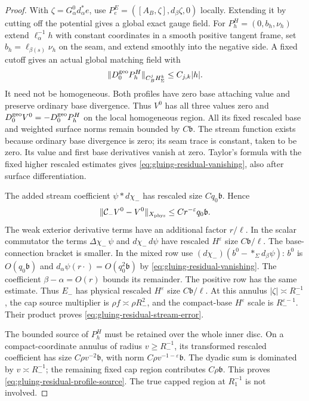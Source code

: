\documentclass[11pt]{amsart}
\theoremstyle{definition}
\theoremstyle{remark}
\theoremstyle{plain}
\begin{document}
\begin{proof}
With $\zeta=G^0_\alpha d_\alpha^*e$, use
$P^E_e=([A_B,\zeta],d_\beta\zeta,0)$ locally. Extending it
by cutting off the potential gives a global exact gauge field.
For $P^H_h=(0,b_h,\nu_h)$ extend $\ell_\alpha^{-1}h$ with
constant coordinates in a smooth positive tangent frame, set
$b_h=\ell_{\beta(s)}\nu_h$ on the seam, and extend smoothly
into the negative side. A fixed cutoff gives an actual global
matching field with
\[
                  \|D_0^{\rm geo}P^H_h\|_{C_B^jH^k_\Sigma}
                                                    \leq C_{j,k}|h|.
\]
It need not be homogeneous. Both profiles have zero base attaching
value and preserve ordinary base divergence. Thus $V^0$ has all
three values zero and $D_0^{\rm geo}V^0=-D_0^{\rm geo}P^H_h$
on the local homogeneous region. All its fixed rescaled base and
weighted surface norms remain bounded by $C\mathfrak b$.
The stream function exists because ordinary base divergence is zero;
its seam trace is constant, taken to be zero. Its value and first
base derivatives vanish at zero. Taylor's formula with the fixed
higher rescaled estimates gives \eqref{eq:gluing-residual-vanishing},
also after surface differentiation.

The added stream coefficient $\psi*d\chi_-$ has rescaled size
$Cq_0\mathfrak b$. Hence
\[
 \|\mathcal C_-V^0-V^0\|_{X_{\rm phys}}
                                      \leq Cr^{-\varepsilon}q_0\mathfrak b.
\]
The weak exterior derivative terms have an additional factor
$r/\ell$. In the scalar commutator the terms
$\Delta\chi_-\,\psi$ and $d\chi_-\,d\psi$ have rescaled
$H^\varepsilon$ size $C\mathfrak b/\ell$.
The base-connection bracket is smaller. In the mixed row use
$(d\chi_-)(b^0-*_\Sigma d_\beta\psi)$:
$b^0$ is $O(q_0\mathfrak b)$ and
$d_\alpha\psi(r\cdot)=O(q_0^2\mathfrak b)$ by
\eqref{eq:gluing-residual-vanishing}. The coefficient
$\beta-\alpha=O(r)$ bounds its remainder. The positive row
has the same estimate. Thus $E_-$ has physical rescaled
$H^\varepsilon$ size $C\mathfrak b/\ell$.
At this annulus $|\zeta|\asymp R_-^{-1}$, the cap source
multiplier is $\rho f\asymp\rho R_-^2$, and the compact-base
$H^\varepsilon$ scale is $R_-^{\varepsilon-1}$. Their product
proves \eqref{eq:gluing-residual-stream-error}.

The bounded source of $P^H_h$ must be retained over the whole
inner disc. On a compact-coordinate annulus of radius $v\geq R_-^{-1}$,
its transformed rescaled coefficient has size
$C\rho v^{-2}\mathfrak b$, with norm
$C\rho v^{-1-\varepsilon}\mathfrak b$. The dyadic sum is
dominated by $v\asymp R_-^{-1}$; the remaining fixed cap
region contributes $C\rho\mathfrak b$. This proves
\eqref{eq:gluing-residual-profile-source}. The true capped
region at $R_1^{-1}$ is not involved.
\end{proof}
\end{document}
